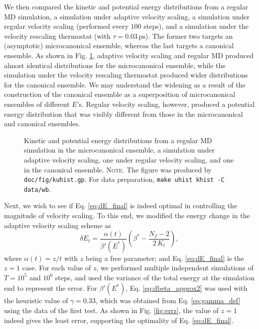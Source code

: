 \documentclass[reprint]{revtex4-1}
\newcommand{\note}[1]{{\color{DarkGreen}\footnotesize \textsc{Note.} #1}}
\begin{document}
We then compared the kinetic and potential energy
distributions from a regular MD simulation,
a simulation under adaptive velocity scaling,
a simulation under regular velocity scaling (performed every $100$ steps),
and
a simulation under the velocity rescaling
thermostat\cite{bussi2007}
(with $\tau = 0.03 \, \mathrm{ps}$).
%
The former two targets an (asymptotic) microcanonical ensemble,
whereas the last targets a canonical ensemble.
%
As shown in Fig. \ref{fig:kuhist},
adaptive velocity scaling and regular MD
produced almost identical distributions for the microcanonical ensemble,
while the simulation under the velocity rescaling thermostat
produced wider distributions for the canonical ensemble.
%
We may understand the widening %
as a result of the construction of the canonical ensemble
as a superposition of microcanonical ensembles of different $E$'s.
%
Regular velocity scaling, however, produced
a potential energy distribution that
was visibly different from
those in the microcanonical and canonical ensembles.
%

\begin{figure}[h]
\begin{center}
  \caption{
    \label{fig:kuhist}
    Kinetic and potential energy distributions
    from a regular MD simulation in the microcanonical ensemble,
    a simulation under adaptive velocity scaling,
    one under regular velocity scaling,
    and one in the canonical ensemble.
    \note{The figure was produced by \texttt{doc/fig/kuhist.gp}.
      For data preparation, \texttt{make uhist khist -C data/wb}.
    }%
  }
\end{center}
\end{figure}


Next, we wish to see if Eq. \eqref{eq:dE_final}
is indeed optimal in controlling the magnitude of velocity scaling.
%
To this end, we modified the energy change in
the adaptive velocity scaling scheme as
%
\begin{equation}
  \delta E_t
  =
  \frac{ \alpha(t) } { \beta'(E^*) }
  \left(
   \beta^* -
   \frac{ N_f - 2 }
   { 2 \, K_t }
  \right)
  ,
  \label{eq:dE_mod}
\end{equation}
%
where $\alpha(t) = z/t$ with $z$ being a free parameter;
and Eq. \eqref{eq:dE_final} is the $z = 1$ case.
%
For each value of $z$,
we performed multiple independent simulations of
$T = 10^5$ and $10^6$ steps,
and used the variance of the total energy at the simulation end
to represent the error.
%
For $\beta'(E^*)$,
Eq. \eqref{eq:dbeta_approx2} was used with the heuristic value of
$\gamma = 0.33$,
which was obtained from Eq. \eqref{eq:gamma_def}
using the data of the first test.
%
As shown in Fig. \ref{fig:errz},
the value of $z = 1$
indeed gives the least error,
supporting the optimality of Eq. \eqref{eq:dE_final}.
\end{document}
